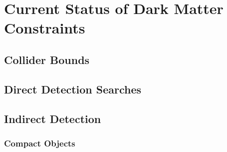   \section{Current Status of Dark Matter Constraints}

  \subsection{Collider Bounds}

  \subsection{Direct Detection Searches}

  \subsection{Indirect Detection}

  \subsubsection{Compact Objects}

  




  